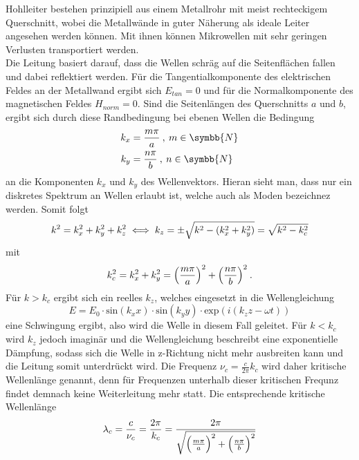 Hohlleiter bestehen prinzipiell aus einem Metallrohr mit meist rechteckigem Querschnitt, wobei die
Metallwände in guter Näherung als ideale Leiter angesehen werden können. Mit ihnen können
Mikrowellen mit sehr geringen Verlusten transportiert werden. \\
Die Leitung basiert darauf, dass die Wellen schräg auf die Seitenflächen fallen und dabei reflektiert werden.
Für die Tangentialkomponente des elektrischen Feldes an der Metallwand ergibt sich $E_{tan}=0 $ und für die
Normalkomponente des magnetischen Feldes $H_{norm}=0$. Sind die Seitenlängen des Querschnitts $a$ und $b$,
ergibt sich durch diese Randbedingung bei ebenen Wellen die Bedingung
\begin{align}
  k_x &= \frac{m\pi}{a} \:, \: m \in \symbb{N} \\
  k_y &= \frac{n\pi}{b} \:, \: n \in \symbb{N}
  \label{eqn:Bwv}
\end{align}
an die Komponenten $k_x$ und $k_y$ des Wellenvektors.
Hieran sieht man, dass nur ein diskretes Spektrum an Wellen erlaubt ist, welche auch als Moden bezeichnez werden.
Somit folgt
\begin{equation}
  k^2 = k_x^2 + k_y^2 + k_z^2 \\
  \iff k_z = \pm \sqrt{k^2-(k_x^2 + k_y^2)} = \sqrt{k^2-k_c^2}
  \label{eqn:wellenv}
\end{equation}
mit
\begin{equation}
  k_c^2=k_x^2 + k_y^2= \Bigl(\frac{m\pi}{a}\Bigr)^2 + \Bigl(\frac{n\pi}{b}\Bigr)^2 \: .
  \label{eqn:Wellenvektor}
\end{equation}
Für $k>k_c$ ergibt sich ein reelles $k_z$, welches eingesetzt in die Wellengleichung
\begin{equation}
  E=E_0 \cdot \text{sin}(k_xx)\cdot \text{sin}(k_yy) \cdot \text{exp}(i(k_zz-\omega t))
  \label{eqn:Wellengleichung}
\end{equation}
eine Schwingung ergibt, also wird die Welle in diesem Fall geleitet. Für $k<k_c$ wird
$k_z$ jedoch imaginär und die Wellengleichung beschreibt eine exponentielle Dämpfung,
sodass sich die Welle in z-Richtung nicht mehr ausbreiten kann und die Leitung somit unterdrückt wird.
Die Frequenz $\nu_c = \frac{c}{2\pi}k_c$ wird daher kritische Wellenlänge genannt, denn
für Frequenzen unterhalb dieser kritischen Frequnz findet demnach keine
Weiterleitung mehr statt. Die entsprechende kritische Wellenlänge
\begin{equation}
  \lambda_c = \frac{c}{\nu_c}=\frac{2\pi}{k_c} =\frac{2\pi}{\sqrt{\Bigl(\frac{m\pi}{a}\Bigr)^2 + \Bigl(\frac{n\pi}{b}\Bigr)^2}}
  \label{eqn:Lambdac}
\end{equation}
